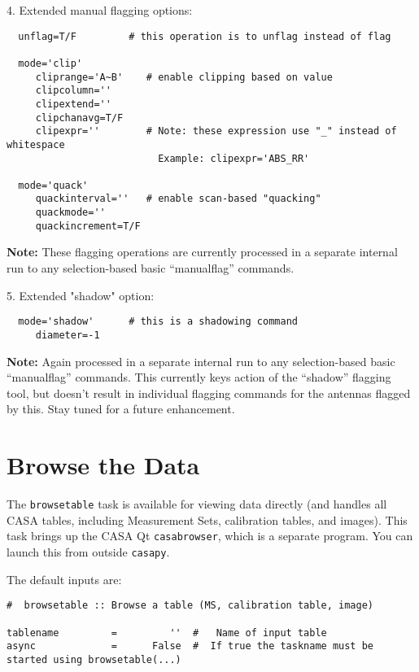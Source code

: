 4. Extended manual flagging options:
\begin{verbatim}
  unflag=T/F         # this operation is to unflag instead of flag

  mode='clip'
     cliprange='A~B'    # enable clipping based on value
     clipcolumn=''
     clipextend=''
     clipchanavg=T/F
     clipexpr=''        # Note: these expression use "_" instead of whitespace
                          Example: clipexpr='ABS_RR'         

  mode='quack'
     quackinterval=''   # enable scan-based "quacking" 
     quackmode=''
     quackincrement=T/F
\end{verbatim}
{\bf Note:} These flagging operations are currently processed in a separate internal run
to any selection-based basic ``manualflag'' commands.

5. Extended "shadow" option:
\begin{verbatim}
  mode='shadow'      # this is a shadowing command
     diameter=-1
\end{verbatim}
{\bf Note:} Again processed in a separate internal run to any
selection-based basic ``manualflag'' commands.  This currently keys action
of the ``shadow'' flagging tool, but doesn't result in individual
flagging commands for the antennas flagged by this.  Stay tuned for
a future enhancement.


\section{Browse the Data}
\label{section:edit.browse}

The {\tt browsetable} task is available for viewing data directly
(and handles all CASA tables, including Measurement Sets, calibration tables,
and images). This task brings up the CASA Qt
{\tt casabrowser}, which is a separate program.  You can launch this
from outside {\tt casapy}.  

The default inputs are:
\small
\begin{verbatim}
#  browsetable :: Browse a table (MS, calibration table, image)

tablename         =         ''  #   Name of input table
async             =      False  #  If true the taskname must be started using browsetable(...)

\end{verbatim}
\normalsize

